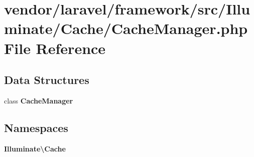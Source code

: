 \section{vendor/laravel/framework/src/\+Illuminate/\+Cache/\+Cache\+Manager.php File Reference}
\label{_cache_manager_8php}
\subsection*{Data Structures}
\begin{DoxyCompactItemize}
\item 
class {\bf Cache\+Manager}
\end{DoxyCompactItemize}
\subsection*{Namespaces}
\begin{DoxyCompactItemize}
\item 
 {\bf Illuminate\textbackslash{}\+Cache}
\end{DoxyCompactItemize}
